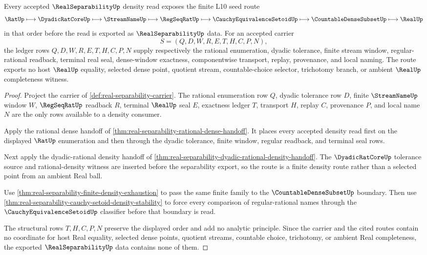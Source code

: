 \begin{theorem}
\label{thm:real-separability-seed-density-ledger}
Every accepted $\RealSeparabilityUp$ density read exposes the finite L10 seed route
$$
\RatUp\longmapsto \DyadicRatCoreUp\longmapsto \StreamNameUp\longmapsto \RegSeqRatUp\longmapsto \CauchyEquivalenceSetoidUp\longmapsto \CountableDenseSubsetUp\longmapsto \RealUp
$$
in that order before the read is exported as $\RealSeparabilityUp$ data. For an accepted carrier
$$
S=(Q,D,W,R,E,T,H,C,P,N),
$$
the ledger rows $Q,D,W,R,E,T,H,C,P,N$ supply respectively the rational enumeration, dyadic tolerance, finite stream window, regular-rational readback, terminal real seal, dense-window exactness, componentwise transport, replay, provenance, and local naming. The route exports no host $\RealUp$ equality, selected dense point, quotient stream, countable-choice selector, trichotomy branch, or ambient $\RealUp$ completeness witness.
\end{theorem}
\begin{proof}
Project the carrier of \autoref{def:real-separability-carrier}. The rational enumeration row $Q$, dyadic tolerance row $D$, finite $\StreamNameUp$ window $W$, $\RegSeqRatUp$ readback $R$, terminal $\RealUp$ seal $E$, exactness ledger $T$, transport $H$, replay $C$, provenance $P$, and local name $N$ are the only rows available to a density consumer.

Apply the rational dense handoff of \autoref{thm:real-separability-rational-dense-handoff}. It places every accepted density read first on the displayed $\RatUp$ enumeration and then through the dyadic tolerance, finite window, regular readback, and terminal seal rows.

Next apply the dyadic-rational density handoff of \autoref{thm:real-separability-dyadic-rational-density-handoff}. The $\DyadicRatCoreUp$ tolerance source and rational-density witness are inserted before the separability export, so the route is a finite density route rather than a selected point from an ambient Real ball.

Use \autoref{thm:real-separability-finite-density-exhaustion} to pass the same finite family to the $\CountableDenseSubsetUp$ boundary. Then use \autoref{thm:real-separability-cauchy-setoid-density-stability} to force every comparison of regular-rational names through the $\CauchyEquivalenceSetoidUp$ classifier before that boundary is read.

The structural rows $T,H,C,P,N$ preserve the displayed order and add no analytic principle. Since the carrier and the cited routes contain no coordinate for host Real equality, selected dense points, quotient streams, countable choice, trichotomy, or ambient Real completeness, the exported $\RealSeparabilityUp$ data contains none of them.
\end{proof}

